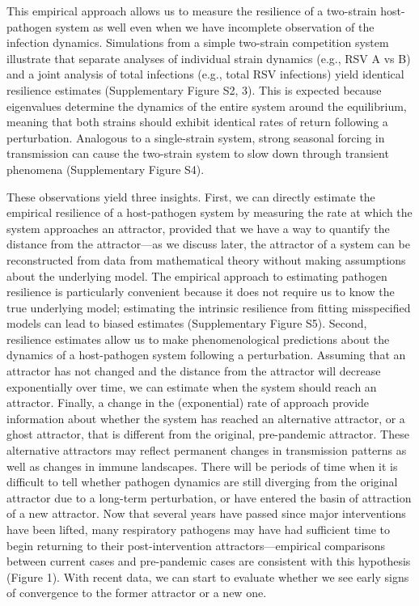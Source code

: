 \documentclass[12pt]{article}
\begin{document}
This empirical approach allows us to measure the resilience of a two-strain host-pathogen system as well even when we have incomplete observation of the infection dynamics.
Simulations from a simple two-strain competition system illustrate that separate analyses of individual strain dynamics (e.g., RSV A vs B) and a joint analysis of total infections (e.g., total RSV infections) yield identical resilience estimates (Supplementary Figure S2, 3).
This is expected because eigenvalues determine the dynamics of the entire system around the equilibrium, meaning that both strains should exhibit identical rates of return following a perturbation.
Analogous to a single-strain system, strong seasonal forcing in transmission can cause the two-strain system to slow down through transient phenomena (Supplementary Figure S4).

These observations yield three insights.
First, we can directly estimate the empirical resilience of a host-pathogen system by measuring the rate at which the system approaches an attractor, provided that we have a way to quantify the distance from the attractor---as we discuss later, the attractor of a system can be reconstructed from data from mathematical theory without making assumptions about the underlying model.
The empirical approach to estimating pathogen resilience is particularly convenient because it does not require us to know the true underlying model;
estimating the intrinsic resilience from fitting misspecified models can lead to biased estimates (Supplementary Figure S5).
Second, resilience estimates allow us to make phenomenological predictions about the dynamics of a host-pathogen system following a perturbation.
Assuming that an attractor has not changed and the distance from the attractor will decrease exponentially over time, we can estimate when the system should reach an attractor.
Finally, a change in the (exponential) rate of approach provide information about whether the system has reached an alternative attractor, or a ghost attractor, that is different from the original, pre-pandemic attractor.
These alternative attractors may reflect permanent changes in transmission patterns as well as changes in immune landscapes.
There will be periods of time when it is difficult to tell whether pathogen dynamics are still diverging from the original attractor due to a long-term perturbation, or have entered the basin of attraction of a new attractor. 
Now that several years have passed since major interventions have been lifted, many respiratory pathogens may have had sufficient time to begin returning to their post-intervention attractors---empirical comparisons between current cases and pre-pandemic cases are consistent with this hypothesis (Figure 1).
With recent data, we can start to evaluate whether we see early signs of convergence to the former attractor or a new one.
\end{document}
